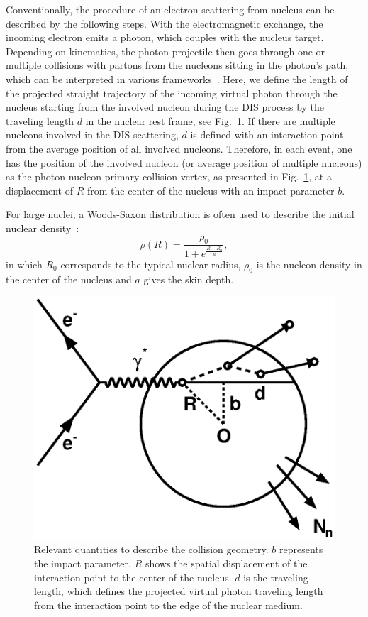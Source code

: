 Conventionally, the procedure of an electron scattering from nucleus can be
described by the following steps. With the electromagnetic exchange, the
incoming electron emits a photon, which couples with the nucleus target.
Depending on kinematics, the photon projectile then goes through one or multiple
collisions with partons from the nucleons sitting in the photon's path, which
can be interpreted in various frameworks~\cite{Piller:1995kh}. Here, we define
the length of the projected straight trajectory of the incoming virtual photon
through the nucleus starting from the involved nucleon during the DIS process
by the traveling length $d$ in the nuclear rest frame, see
Fig.~\ref{fig:geometry}. If there are multiple nucleons involved in the DIS
scattering, $d$ is defined with an interaction point from the average position
of all involved nucleons. Therefore, in each event, one has the position of the
involved nucleon (or average position of multiple nucleons) as the
photon-nucleon primary collision vertex, as presented in
Fig.~\ref{fig:geometry}, at a displacement of $R$ from the center of the nucleus
with an impact parameter $b$.

For large nuclei, a Woods-Saxon distribution is often used to describe the 
initial nuclear density~\cite{Miller:2007ri}:
\begin{equation}
\rho(R)=\frac{\rho_{0}}{1+e^{\frac{R-R_{0}}{a}}},
\label{eqn:woodsaxon}
\end{equation}
in which $R_{0}$ corresponds to the typical nuclear radius, $\rho_{0}$ is the nucleon density in the center of the nucleus and $a$ gives the skin depth.

\begin{figure}
\begin{center}
\includegraphics[width=0.5\columnwidth]{plots/chpt7/geometry_definition.eps}
\caption[A schematic view of the \eA\ collision and the relevant geometric quantity definition] {Relevant quantities to describe the collision geometry. $b$ represents the impact parameter. $R$ shows the spatial displacement of the interaction point to the center of the nucleus. $d$ is the traveling length, which defines the projected virtual photon traveling length from the interaction point to the edge of the nuclear medium.}
\label{fig:geometry}
\end{center}
\end{figure}

